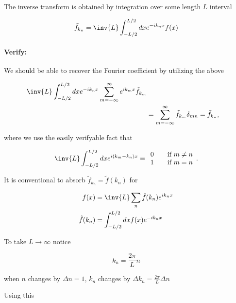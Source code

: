 The inverse transform is obtained by integration over some length $L$ interval

\begin{equation}\label{eqn:relativisticElectrodynamicsL15:310}
\tilde{f}_{k_n} = \inv{L} \int_{-L/2}^{L/2} dx e^{-i k_n x} f(x)
\end{equation}

\paragraph{Verify:}

We should be able to recover the Fourier coefficient by utilizing the above

\begin{align*}
\inv{L} \int_{-L/2}^{L/2} dx e^{-i k_n x} \sum_{m=-\infty}^\infty e^{i k_m x} \tilde{f}_{k_m} \\
&= \sum_{m = -\infty}^\infty \tilde{f}_{k_m} \delta_{mn} = \tilde{f}_{k_n},
\end{align*}

where we use the easily verifyable fact that 

\begin{equation}\label{eqn:relativisticElectrodynamicsL15:800}
\inv{L} \int_{-L/2}^{L/2} dx e^{i (k_m - k_n) x} = 
\begin{array}{l l}
0 & \quad \mbox{if $m \ne n$} \\
1 & \quad \mbox{if $m = n$} \\
\end{array}.
\end{equation}

It is conventional to absorb $\tilde{f}_{k_n} = \tilde{f}(k_n)$ for

\begin{align}\label{eqn:relativisticElectrodynamicsL15:330}
f(x) &= \inv{L} \sum_n \tilde{f}(k_n) e^{i k_n x} \\
\tilde{f}(k_n) &= \int_{-L/2}^{L/2} dx f(x) e^{-i k_n x}
\end{align}

To take $L \rightarrow \infty$ notice

\begin{equation}\label{eqn:relativisticElectrodynamicsL15:350}
k_n = \frac{2 \pi}{L} n
\end{equation}

when $n$ changes by $\Delta n = 1$, $k_n$ changes by $\Delta k_n = \frac{2 \pi}{L} \Delta n$

Using this 


